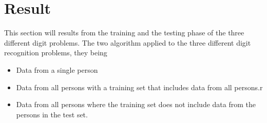 \section{Result}
This section will results from the training and the testing phase of the three different digit problems.  The two 
algorithm applied to the three different digit recognition problems, they 
being 
\begin{itemize}
\item	Data from a single person
\item	Data from all persons with a training set that includes data from all 
persons.r
\item Data from all persons where the training set does not include data from 
the persons in the test set.
\end{itemize}

